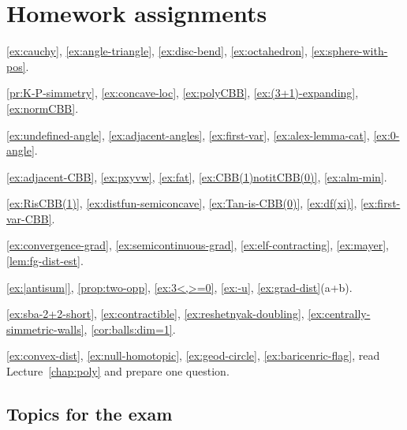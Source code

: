 \chapter*{Homework assignments}

\ref{ex:cauchy},
\ref{ex:angle-triangle},
\ref{ex:disc-bend},
\ref{ex:octahedron},
\ref{ex:sphere-with-pos}.

\ref{pr:K-P-simmetry},
\ref{ex:concave-loc},
\ref{ex:polyCBB},
\ref{ex:(3+1)-expanding},
\ref{ex:normCBB}.

\ref{ex:undefined-angle},
\ref{ex:adjacent-angles},
\ref{ex:first-var},
\ref{ex:alex-lemma-cat},
\ref{ex:0-angle}.

\ref{ex:adjacent-CBB},
\ref{ex:pxyvw},
\ref{ex:fat},
\ref{ex:CBB(1)notitCBB(0)},
\ref{ex:alm-min}.

\ref{ex:RisCBB(1)},
\ref{ex:distfun-semiconcave},
\ref{ex:Tan-is-CBB(0)},
\ref{ex:df(xi)},
\ref{ex:first-var-CBB}.

\ref{ex:convergence-grad},
\ref{ex:semicontinuous-grad},
\ref{ex:elf-contracting},
\ref{ex:mayer},
\ref{lem:fg-dist-est}.

\ref{ex:|antisum|},
\ref{prop:two-opp},
\ref{ex:3<,>=0},
\ref{ex:-u},
\ref{ex:grad-dist}(a+b).

\ref{ex:sba-2+2-short},
\ref{ex:contractible},
\ref{ex:reshetnyak-doubling},
\ref{ex:centrally-simmetric-walls},
\ref{cor:balls:dim=1}.

\ref{ex:convex-dist},
\ref{ex:null-homotopic},
\ref{ex:geod-circle},
\ref{ex:baricenric-flag},
read Lecture~\ref{chap:poly} and prepare one question.

\section*{Topics for the exam}

